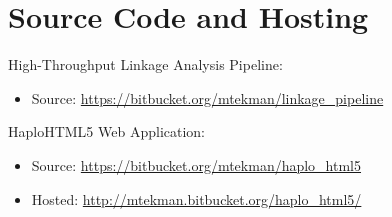 \pagebreak
\listoffigures
\begingroup
\let\clearpage\relax
\vspace{50pt}
\listoftables
\vspace{50pt}
\lstlistoflistings

\vspace{50pt}
\chapter*{Source Code and Hosting}


\begin{description}
\renewcommand\labelitemi{\textendash}
\item{{High-Throughput Linkage Analysis Pipeline:}
	\begin{itemize}
		\item{{{Source:}} \url{https://bitbucket.org/mtekman/linkage_pipeline}}
	\end{itemize}
}
\item{{HaploHTML5 Web Application:} 
	\begin{itemize}
		\item{{{Source:}} \url{https://bitbucket.org/mtekman/haplo_html5}}
		\item{{{Hosted:}} \url{http://mtekman.bitbucket.org/haplo_html5/}}
	\end{itemize}
}
\end{description}
